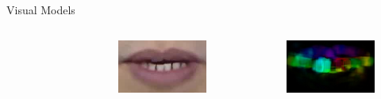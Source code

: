 \documentclass[xcolor=table]{beamer}
\begin{document}
\begin{frame}{Visual Models}
\begin{columns}[T]
\begin{itemize}
\begin{columns}[T]
\begin{figure}
            \end{figure}
            \begin{figure}
            \includegraphics[width=\textwidth]{fig/opti1.jpeg}   
            \end{figure}
            \begin{figure}
            \includegraphics[width=\textwidth]{fig/opti.jpeg}   
            \end{figure}
        \end{columns}
    \end{itemize}
    \end{columns}
\end{frame}
\end{document}
